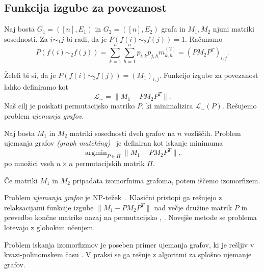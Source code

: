 \documentclass[mat2, tisk]{fmfdelo}
\newcommand{\loss}{\mathcal L}
\newcommand{\Loss}[1]{\mathcal L _\text{#1}}
\begin{document}
\subsection{Funkcija izgube za povezanost}
Naj bosta $G_1 = ([n], E_1)$ in $G_2 = ([n], E_2)$ grafa
in $M_1, M_2$ njuni matriki sosednosti.
Za $i \sim_1 j$ bi radi, da je $P(f(i)  \sim_2 f(j)) = 1$.
Računamo
$$
P(f(i) \sim_2 f(j)) = \sum_{k= 1}^n \sum_{h = 1}^n p_{i,
k} p_{j, h} m_{k,h}^{(2)}
= (P M_2 P^T)_{i, j}.
$$
\begin{definicija}
  \label{def:graph_matching_loss}
  Želeli bi si, da je $P(f(i) \sim_2 f(j)) = (M_1)_{i,j}$.
  Funkcijo izgube za povezanost lahko definiramo kot
  $$
  \loss_\sim = \|M_1 - P M_2 P^T\|.
  $$
  Naš cilj je poiskati permutacijsko matriko $P$, ki minimalizira
  $\loss_\sim(P)$. Rešujemo problem
  \emph{ujemanja grafov}.
\end{definicija}
\begin{definicija}
  \label{def:graph_matching}
  Naj bosta $M_1$ in $M_2$ matriki sosednosti dveh grafov
  na $n$ vozliščih. Problem ujemanja grafov
  \emph{(graph matching)}~\cite{lyzinski2015graphmatchingrelaxrisk} je
  definiran kot
  iskanje minimuma
  $$
  \operatorname{argmin}_{P \in \Pi} \|M_1 - PM_2P^T \|,
  $$
  po  množici vseh $n \times n$ permutacijskih  matrik $\Pi$.

  Če matriki $M_1$ in $M_2$ pripadata izomorfnima
  grafoma, potem iščemo izomorfizem.
\end{definicija}
Problem \emph{ujemanja grafov} je NP-težek~\cite{sahni1976qapisnphard}.
Klasični pristopi ga
rešujejo z relaksacijami funkcije izgube $\|M_1 - P M_2
P^T\|$ nad večje družine matrik $P$ in prevedbo
končne matrike nazaj na permutacijsko
\cite{lyzinski2015graphmatchingrelaxrisk},
\cite{aflalo2025convexrelaxation}.
Novejše metode se problema lotevajo z globokim učenjem.

Problem iskanja izomorfizmov je poseben primer
ujemanja grafov, ki je rešljiv v kvazi-polinomskem času
\cite{babai2016graphisomorphismquasipolynomialtime}.
V praksi se
ga rešuje z algoritmi za splošno ujemanje grafov.
\end{document}
